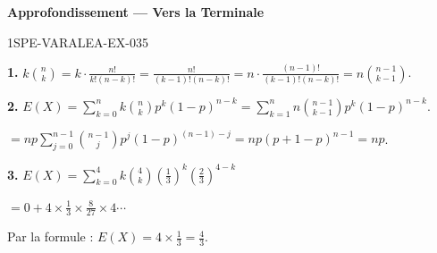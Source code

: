 \begin{center}\textbf{Approfondissement — Vers la Terminale}\end{center}
\begin{corrige}{1SPE-VARALEA-EX-035}

\textbf{1.} $k\binom{n}{k} = k \cdot \frac{n!}{k!(n-k)!} = \frac{n!}{(k-1)!(n-k)!} = n \cdot \frac{(n-1)!}{(k-1)!(n-k)!} = n\binom{n-1}{k-1}$.

\medskip
\textbf{2.} $E(X) = \sum_{k=0}^{n} k\binom{n}{k}p^k(1-p)^{n-k} = \sum_{k=1}^{n} n\binom{n-1}{k-1}p^k(1-p)^{n-k}$.

$= np \sum_{j=0}^{n-1} \binom{n-1}{j}p^j(1-p)^{(n-1)-j} = np(p+1-p)^{n-1} = np$.

\medskip
\textbf{3.} $E(X) = \sum_{k=0}^{4} k\binom{4}{k}\left(\frac{1}{3}\right)^k\left(\frac{2}{3}\right)^{4-k}$

$= 0 + 4 \times \frac{1}{3} \times \frac{8}{27} \times 4 \cdots$

Par la formule : $E(X) = 4 \times \frac{1}{3} = \frac{4}{3}$. \checkmark

\end{corrige}
